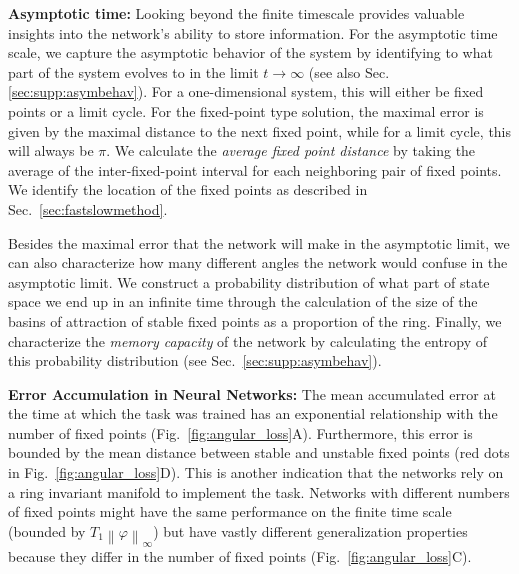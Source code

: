 \documentclass{article} %
\newcommand{\ptitle}[1]{\textbf{#1:}\xspace}
\newcounter{ct}
\newcommand{\uniformNorm}[1]{\left\|#1\right\|_\infty} %
\theoremstyle{definition}
\theoremstyle{remark}
\begin{document}
\ptitle{Asymptotic time}
Looking beyond the finite timescale provides valuable insights into the network's ability to store information.
For the asymptotic time scale, we capture the asymptotic behavior of the system by identifying to what part of the system evolves to in the limit \(t\rightarrow\infty\) (see also Sec.\ref{sec:supp:asymbehav}).
For a one-dimensional system, this will either be fixed points or a limit cycle.
For the fixed-point type solution, the maximal error is given by the maximal distance to the next fixed point, while for a limit cycle, this will always be \(\pi\).
We calculate the \emph{average fixed point distance} by taking the average of the inter-fixed-point interval for each neighboring pair of fixed points.
We identify the location of the fixed points as described in Sec.~\ref{sec:fastslowmethod}.

Besides the maximal error that the network will make in the asymptotic limit, we can also characterize how many different angles the network would confuse in the asymptotic limit.
We construct a probability distribution of what part of state space we end up in an infinite time through the calculation of the size of the basins of attraction of stable fixed points as a proportion of the ring.
Finally, we characterize the \emph{memory capacity} of the network by calculating the entropy of this probability distribution (see Sec.~\ref{sec:supp:asymbehav}).


\ptitle{Error Accumulation in Neural Networks}
The mean accumulated error at the time at which the task was trained has an exponential relationship with the number of fixed points (Fig.~\ref{fig:angular_loss}A).
Furthermore, this error is bounded by the mean distance between stable and unstable fixed points (red dots in Fig.~\ref{fig:angular_loss}D).
This is another indication that the networks rely on a ring invariant manifold to implement the task.
Networks with different numbers of fixed points might have the same performance on the finite time scale (bounded by \(T_{1}\uniformNorm{\varphi}\)) %
 but have vastly different generalization properties because they differ in the number of fixed points (Fig.~\ref{fig:angular_loss}C).
\end{document}
